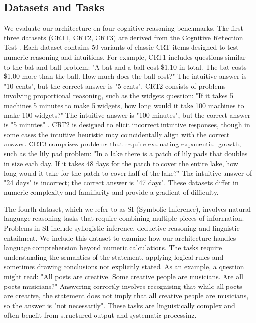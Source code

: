 \documentclass[11pt]{article}
\begin{document}
\subsection{Datasets and Tasks}
We evaluate our architecture on four cognitive reasoning benchmarks.  The
first three datasets (CRT1, CRT2, CRT3) are derived from the Cognitive
Reflection Test \cite{frederick2005cognitive}.  Each dataset contains 50 variants of classic CRT items
designed to test numeric reasoning and intuitions.  For example, CRT1
includes questions similar to the bat-and-ball problem: "A bat and a ball cost \$1.10 in total. The bat costs \$1.00 more than the ball. How much does the ball cost?" The intuitive answer is "10 cents", but the correct answer is "5 cents".
CRT2 consists of problems involving proportional reasoning, such as the
widgets question: "If it takes 5 machines 5 minutes to make 5 widgets, how
long would it take 100 machines to make 100 widgets?"  The intuitive answer
is "100 minutes", but the correct answer is "5 minutes" \cite{frederick2005cognitive}.
CRT2 is designed to elicit incorrect intuitive responses, though in some cases
the intuitive heuristic may coincidentally align with the correct answer.
CRT3 comprises problems that require evaluating exponential growth, such as
the lily pad problem: "In a lake there is a patch of lily pads that doubles
in size each day.  If it takes 48 days for the patch to cover the entire
lake, how long would it take for the patch to cover half of the lake?"  The
intuitive answer of "24 days" is incorrect; the correct answer is "47
days".  These datasets differ in numeric complexity and familiarity and
provide a gradient of difficulty.

The fourth dataset, which we refer to as SI (Symbolic Inference), involves
natural language reasoning tasks that require combining multiple pieces of
information.  Problems in SI include syllogistic inference, deductive
reasoning and linguistic entailment.  We include this dataset to examine
how our architecture handles language comprehension beyond numeric
calculations.  The tasks require understanding the semantics of the
statement, applying logical rules and sometimes drawing conclusions not
explicitly stated.  As an example, a question might read: "All poets are
creative.  Some creative people are musicians.  Are all poets musicians?"
Answering correctly involves recognising that while all poets are creative,
the statement does not imply that all creative people are musicians, so the
answer is "not necessarily".  These tasks are linguistically complex and
often benefit from structured output and systematic processing.
\end{document}
